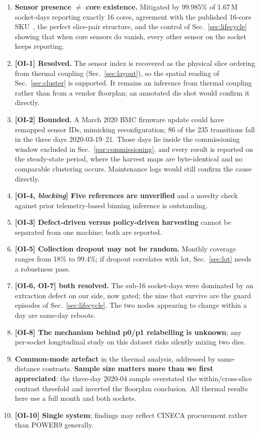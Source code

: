 \documentclass[10pt,conference]{IEEEtran}
\begin{document}
\begin{enumerate}
\item \textbf{Sensor presence $\ne$ core existence.} Mitigated by 99.985\% of 1.67\,M socket-days
reporting exactly 16 cores, agreement with the published 16-core SKU~\cite{ibm_ac922}, the perfect
slice-pair structure, and the control of Sec.~\ref{sec:lifecycle} showing that when core sensors do
vanish, every other sensor on the socket keeps reporting.
\item \textbf{[OI-1] Resolved.} The sensor index is recovered as the physical slice ordering from
thermal coupling (Sec.~\ref{sec:layout}), so the spatial reading of Sec.~\ref{sec:cluster} is
supported. It remains an inference from thermal coupling rather than from a vendor floorplan; an
annotated die shot would confirm it directly.
\item \textbf{[OI-2] Bounded.} A March 2020 BMC firmware update could have remapped sensor IDs,
mimicking reconfiguration; 86 of the 235 transitions fall in the three days 2020-03-19--21. Those
days lie inside the commissioning window excluded in Sec.~\ref{par:commissioning}, and every
result is reported on the steady-state period, where the harvest maps are byte-identical and no
comparable clustering occurs. Maintenance logs would still confirm the cause directly.
\item \textbf{[OI-4, \emph{blocking}] Five references are unverified} and a novelty check against
prior telemetry-based binning inference is outstanding.
\item \textbf{[OI-3] Defect-driven versus policy-driven harvesting} cannot be separated from one
machine; both are reported.
\item \textbf{[OI-5] Collection dropout may not be random.} Monthly coverage ranges from 18\% to
99.4\%; if dropout correlates with lot, Sec.~\ref{sec:lot} needs a robustness pass.
\item \textbf{[OI-6, OI-7] both resolved.} The sub-16 socket-days were dominated by an
extraction defect on our side, now gated; the nine that survive are the guard episodes of
Sec.~\ref{sec:lifecycle}. The two nodes appearing to change within a day are same-day reboots.
\item \textbf{[OI-8] The mechanism behind p0/p1 relabelling is unknown}; any per-socket
longitudinal study on this dataset risks silently mixing two dies.
\item \textbf{Common-mode artefact} in the thermal analysis, addressed by same-distance contrasts.
\textbf{Sample size matters more than we first appreciated}: the three-day 2020-04 sample
overstated the within/cross-slice contrast threefold and inverted the floorplan conclusion. All
thermal results here use a full month and both sockets.
\item \textbf{[OI-10] Single system}; findings may reflect CINECA procurement rather than POWER9
generally.
\end{enumerate}
\end{document}
